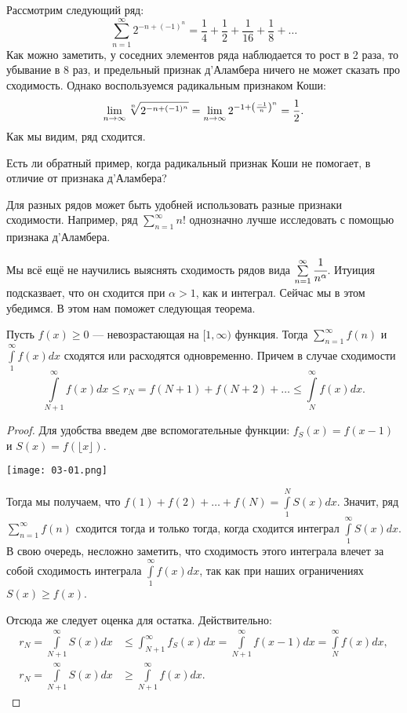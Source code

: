 \documentclass[a4paper, 12pt]{article}
\begin{document}
\begin{Examples}
Рассмотрим следующий ряд:
$$
\sum\limits_{n=1}^{\infty} 2^{-n+(-1)^n} = \frac{1}{4} + \frac{1}{2} + \frac{1}{16} + \frac{1}{8} + \ldots 
$$
Как можно заметить, у соседних элементов ряда наблюдается то рост в 2 раза, то убывание в 8 раз, и предельный признак д'Аламбера ничего не может сказать про сходимость. Однако воспользуемся радикальным признаком Коши:
$$
\lim_{n\rightarrow \infty} \sqrt[n]{2^{-n + (-1)^n}} = \lim_{n\rightarrow \infty} 2^{-1 + \left(\frac{-1}{n}\right)^n} = \frac{1}{2}.
$$
Как мы видим, ряд сходится.
\end{Examples}

\begin{Task}
Есть ли обратный пример, когда радикальный признак Коши не помогает, в отличие от признака д'Аламбера?
\end{Task}

Для разных рядов может быть удобней использовать разные признаки сходимости. Например, ряд $\sum\limits_{n=1}^{\infty} n!$ однозначно лучше исследовать с помощью признака д'Аламбера.

Мы всё ещё не научились выяснять сходимость рядов вида $\sum\limits_{n = 1}^{\infty}\cfrac{1}{n^\alpha}$. Итуиция подсказвает, что он сходится при $\alpha > 1$, как и интеграл. Сейчас мы в этом убедимся. В этом нам поможет следующая теорема.

\begin{Test}

Пусть $f(x) \geqslant 0$ --- невозрастающая на $[1, \infty)$ функция. Тогда $\sum\limits_{n=1}^{\infty}f(n)$ и $\int\limits_1^{\infty}f(x)dx$ сходятся или расходятся одновременно. Причем в случае сходимости
$$
\int\limits_{N+1}^{\infty}f(x)dx \leqslant r_N = f(N+1) + f(N+2) + \ldots \leqslant \int\limits_N^\infty f(x)dx.
$$
\end{Test}

\begin{proof}
Для удобства введем две вспомогательные функции: $f_S(x) = f(x-1)$ и $S(x) = f(\lfloor x \rfloor)$.

\begin{center}
\texttt{[image: 03-01.png]}
\end{center}

Тогда мы получаем, что $f(1) + f(2) + \ldots + f(N) = \int\limits_1^N S(x)dx$. Значит, ряд $\sum\limits_{n=1}^\infty f(n)$ сходится тогда и только тогда, когда сходится интеграл $\int\limits_1^\infty S(x)dx$. В свою очередь, несложно заметить, что сходимость этого интеграла влечет за собой сходимость интеграла $\int\limits^\infty_1 f(x)dx$, так как  при наших ограничениях $S(x) \geqslant f(x)$.

Отсюда же следует оценка для остатка. Действительно:
\begin{align*}
r_{N} = \int\limits_{N+1}^\infty S(x) dx & \leqslant \int_{N+1}^\infty f_S(x)dx = \int\limits_{N+1}^\infty f(x-1)dx = \int\limits_N^\infty f(x)dx, \\
r_{N} = \int\limits_{N+1}^\infty S(x)dx & \geqslant \int\limits_{N+1}^{\infty}f(x)dx.
\end{align*}
\end{proof}
\end{document}
